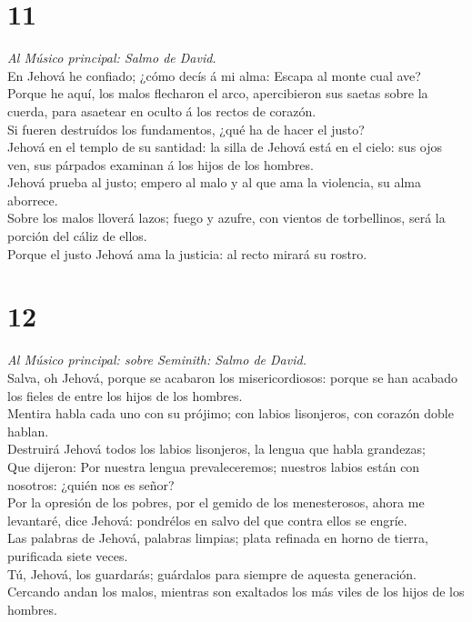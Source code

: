 \hypertarget{section-10}{%
\section{11}\label{section-10}}

 \emph{Al Músico principal: Salmo de David.}\\
En Jehová he confiado; ¿cómo decís á mi alma: Escapa al monte cual
ave?\\
 Porque he aquí, los malos flecharon el arco, apercibieron
sus saetas sobre la cuerda, para asaetear en oculto á los rectos de
corazón.\\
 Si fueren destruídos los fundamentos, ¿qué ha de hacer el
justo?\\
 Jehová en el templo de su santidad: la silla de Jehová está
en el cielo: sus ojos ven, sus párpados examinan á los hijos de los
hombres.\\
 Jehová prueba al justo; empero al malo y al que ama la
violencia, su alma aborrece.\\
 Sobre los malos lloverá lazos; fuego y azufre, con vientos
de torbellinos, será la porción del cáliz de ellos.\\
 Porque el justo Jehová ama la justicia: al recto mirará su
rostro.

\hypertarget{section-11}{%
\section{12}\label{section-11}}

 \emph{Al Músico principal: sobre Seminith: Salmo de
David.}\\
Salva, oh Jehová, porque se acabaron los misericordiosos: porque se han
acabado los fieles de entre los hijos de los hombres.\\
 Mentira habla cada uno con su prójimo; con labios
lisonjeros, con corazón doble hablan.\\
 Destruirá Jehová todos los labios lisonjeros, la lengua que
habla grandezas;\\
 Que dijeron: Por nuestra lengua prevaleceremos; nuestros
labios están con nosotros: ¿quién nos es señor?\\
 Por la opresión de los pobres, por el gemido de los
menesterosos, ahora me levantaré, dice Jehová: pondrélos en salvo del
que contra ellos se engríe.\\
 Las palabras de Jehová, palabras limpias; plata refinada en
horno de tierra, purificada siete veces.\\
 Tú, Jehová, los guardarás; guárdalos para siempre de
aquesta generación.\\
 Cercando andan los malos, mientras son exaltados los más
viles de los hijos de los hombres.

